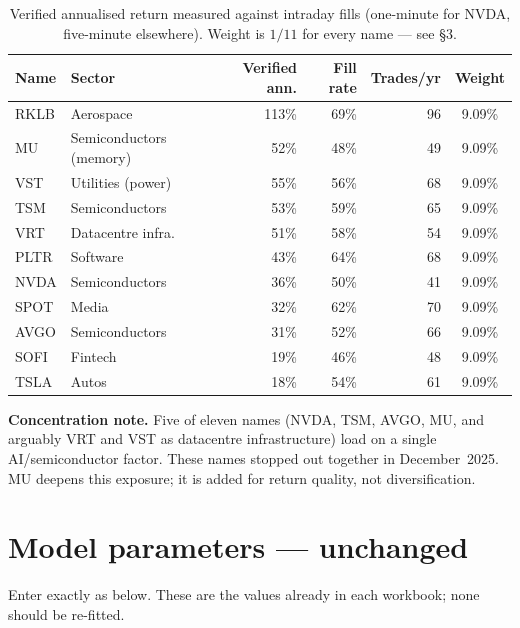 \documentclass[11pt]{article}
\begin{document}
\begin{table}[H]\centering\small
\renewcommand{\arraystretch}{1.15}
\begin{tabular}{l l r r r c}
\toprule
\textbf{Name} & \textbf{Sector} & \textbf{Verified ann.} & \textbf{Fill rate} & \textbf{Trades/yr} & \textbf{Weight}\\
\midrule
RKLB & Aerospace           & 113\% & 69\% & 96  & 9.09\%\\
\rowcolor{bckeep} MU & Semiconductors (memory) & 52\% & 48\% & 49 & 9.09\%\\
VST  & Utilities (power)   & 55\%  & 56\% & 68  & 9.09\%\\
TSM  & Semiconductors      & 53\%  & 59\% & 65  & 9.09\%\\
VRT  & Datacentre infra.   & 51\%  & 58\% & 54  & 9.09\%\\
PLTR & Software            & 43\%  & 64\% & 68  & 9.09\%\\
NVDA & Semiconductors      & 36\%  & 50\% & 41  & 9.09\%\\
SPOT & Media               & 32\%  & 62\% & 70  & 9.09\%\\
AVGO & Semiconductors      & 31\%  & 52\% & 66  & 9.09\%\\
SOFI & Fintech             & 19\%  & 46\% & 48  & 9.09\%\\
TSLA & Autos               & 18\%  & 54\% & 61  & 9.09\%\\
\bottomrule
\end{tabular}
\caption*{\footnotesize Verified annualised return measured against intraday fills (one-minute
for NVDA, five-minute elsewhere). Weight is $1/11$ for every name --- see \S3.}
\end{table}

\textbf{Concentration note.} Five of eleven names (NVDA, TSM, AVGO, MU, and arguably VRT and
VST as datacentre infrastructure) load on a single AI/semiconductor factor. These names stopped
out together in December~2025. MU deepens this exposure; it is added for return quality, not
diversification.

\section{Model parameters --- unchanged}

Enter exactly as below. These are the values already in each workbook; none should be re-fitted.
\end{document}
